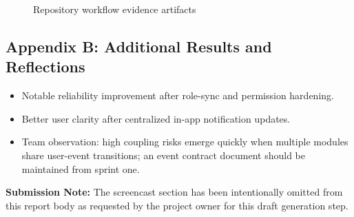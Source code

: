 \documentclass[12pt,a4paper]{article}
\begin{document}
\begin{figure}[H]
\centering
{}
\caption{Repository workflow evidence artifacts}
\end{figure}

\subsection{Appendix B: Additional Results and Reflections}
\begin{itemize}[leftmargin=*]
    \item Notable reliability improvement after role-sync and permission hardening.
    \item Better user clarity after centralized in-app notification updates.
    \item Team observation: high coupling risks emerge quickly when multiple modules share user-event transitions; an event contract document should be maintained from sprint one.
\end{itemize}

\textbf{Submission Note:} The screencast section has been intentionally omitted from this report body as requested by the project owner for this draft generation step.
\end{document}
